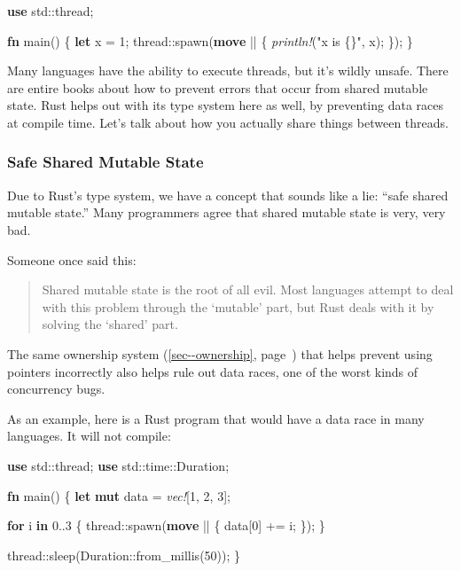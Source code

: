 \documentclass[a4paper,]{book}
\renewcommand*{\hyperlink}[2]{%
 #2 (\autoref{#1}, page~\pageref{#1})}
\newenvironment{Shaded}{\begin{snugshade}}{\end{snugshade}}
\newcommand{\KeywordTok}[1]{\textcolor[rgb]{0.13,0.29,0.53}{\textbf{{#1}}}}
\newcommand{\DecValTok}[1]{\textcolor[rgb]{0.00,0.00,0.81}{{#1}}}
\newcommand{\StringTok}[1]{\textcolor[rgb]{0.31,0.60,0.02}{{#1}}}
\newcommand{\PreprocessorTok}[1]{\textcolor[rgb]{0.56,0.35,0.01}{\textit{{#1}}}}
\newcommand{\NormalTok}[1]{{#1}}
\begin{document}
\begin{Shaded}
\begin{Highlighting}[]
\KeywordTok{use} \NormalTok{std::thread;}

\KeywordTok{fn} \NormalTok{main() \{}
    \KeywordTok{let} \NormalTok{x = }\DecValTok{1}\NormalTok{;}
    \NormalTok{thread::spawn(}\KeywordTok{move} \NormalTok{|| \{}
        \PreprocessorTok{println!}\NormalTok{(}\StringTok{"x is \{\}"}\NormalTok{, x);}
    \NormalTok{\});}
\NormalTok{\}}
\end{Highlighting}
\end{Shaded}

Many languages have the ability to execute threads, but it's wildly
unsafe. There are entire books about how to prevent errors that occur
from shared mutable state. Rust helps out with its type system here as
well, by preventing data races at compile time. Let's talk about how you
actually share things between threads.

\subsubsection{Safe Shared Mutable
State}\label{safe-shared-mutable-state}

Due to Rust's type system, we have a concept that sounds like a lie:
``safe shared mutable state.'' Many programmers agree that shared
mutable state is very, very bad.

Someone once said this:

\begin{quote}
Shared mutable state is the root of all evil. Most languages attempt to
deal with this problem through the `mutable' part, but Rust deals with
it by solving the `shared' part.
\end{quote}

The same \protect\hyperlink{sec--ownership}{ownership system} that helps
prevent using pointers incorrectly also helps rule out data races, one
of the worst kinds of concurrency bugs.

As an example, here is a Rust program that would have a data race in
many languages. It will not compile:

\begin{Shaded}
\begin{Highlighting}[]
\KeywordTok{use} \NormalTok{std::thread;}
\KeywordTok{use} \NormalTok{std::time::Duration;}

\KeywordTok{fn} \NormalTok{main() \{}
    \KeywordTok{let} \KeywordTok{mut} \NormalTok{data = }\PreprocessorTok{vec!}\NormalTok{[}\DecValTok{1}\NormalTok{, }\DecValTok{2}\NormalTok{, }\DecValTok{3}\NormalTok{];}

    \KeywordTok{for} \NormalTok{i }\KeywordTok{in} \DecValTok{0.}\NormalTok{.}\DecValTok{3} \NormalTok{\{}
        \NormalTok{thread::spawn(}\KeywordTok{move} \NormalTok{|| \{}
            \NormalTok{data[}\DecValTok{0}\NormalTok{] += i;}
        \NormalTok{\});}
    \NormalTok{\}}

    \NormalTok{thread::sleep(Duration::from_millis(}\DecValTok{50}\NormalTok{));}
\NormalTok{\}}
\end{Highlighting}
\end{Shaded}
\end{document}
